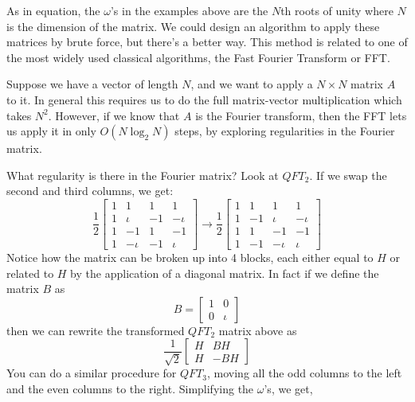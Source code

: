 As in equation, the $\omega$'s in the examples above are the $N$th roots of unity where $N$ is the dimension of the matrix. We could design an algorithm to apply these matrices by brute force, but there's a better way. This method is related to one of the most widely used classical algorithms, the Fast Fourier Transform or FFT.

Suppose we have a vector of length $N$, and we want to apply a $N\times N$ matrix $A$ to it. In general this requires us to do the full matrix-vector multiplication which takes $N^2$. However, if we know that $A$ is the Fourier transform, then the FFT lets us apply it in only $O(N\log_2 N)$ steps, by exploring regularities in the Fourier matrix.

What regularity is there in the Fourier matrix? Look at $QFT_2$. If we swap the second and third columns, we get:
\[
\frac{1}{2}\begin{bmatrix}
    1 & 1 & 1 & 1 \\
    1 & \iota & -1 & -\iota \\
    1 & -1 &1 & -1 \\
    1 & -\iota & -1 & \iota
\end{bmatrix}\rightarrow \frac{1}{2}\begin{bmatrix}
    1 & 1 & 1 & 1 \\
    1 & -1 & \iota & -\iota \\
    1 & 1 & -1 & -1 \\
    1 & -1 & -\iota & \iota
\end{bmatrix}
\]
Notice how the matrix can be broken up into 4 blocks, each either equal to $H$ or related to $H$ by the application of a diagonal matrix. In fact if we define the matrix $B$ as
\[
B=\begin{bmatrix}
    1 & 0\\
    0 & \iota
\end{bmatrix}
\]
then we can rewrite the transformed $QFT_2$ matrix above as
\[
\frac{1}{\sqrt{2}}\begin{bmatrix}
    H & BH \\
    H & -BH
\end{bmatrix}
\]
You can do a similar procedure for $QFT_3$, moving all the odd columns to the left and the even columns to the right. Simplifying the $\omega$'s, we get,
